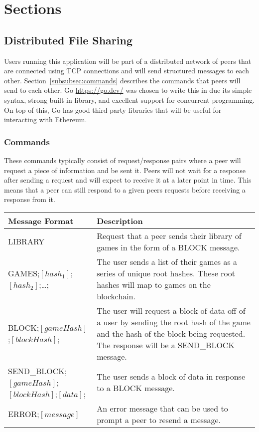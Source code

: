 \section{Sections}

\subsection{Distributed File Sharing}

Users running this application will be part of a distributed network of peers that are connected using TCP connections and will send structured messages to each other. Section~\ref{subsubsec:commands} describes the commands that peers will send to each other.
\x
Go \url{https://go.dev/} was chosen to write this in due its simple syntax, strong built in library, and excellent support for concurrent programming. On top of this, Go has good third party libraries that will be useful for interacting with Ethereum.

\subsubsection*{Commands}
\label{subsubsec:commands}

These commands typically consist of request/response pairs where a peer will request a piece of information and be sent it. Peers will not wait for a response after sending a request and will expect to receive it at a later point in time. This means that a peer can still respond to a given peers requests before receiving a response from it.

\begin{longtable}{p{} p{}}
  \toprule
  \textbf{Message Format} & \textbf{Description}\\
  \midrule\midrule
  LIBRARY
  & Request that a peer sends their library of games in the form of a BLOCK message.\\
  GAMES;$[hash_1]$;$[hash_2]$;\ldots;
  & The user sends a list of their games as a series of unique root hashes. These root hashes will map to games on the blockchain.\\
  \midrule
  BLOCK;$[gameHash]$;$[blockHash]$;
  & The user will request a block of data off of a user by sending the root hash of the game and the hash of the block being requested. The response will be a SEND\_BLOCK message.\\
  SEND\_BLOCK;$[gameHash]$;\newline $[blockHash]$;$[data]$;
  & The user sends a block of data in response to a BLOCK message.\\
  \midrule
  ERROR;$[message]$
  & An error message that can be used to prompt a peer to resend a message.\\
  \bottomrule\bottomrule
\end{longtable}

